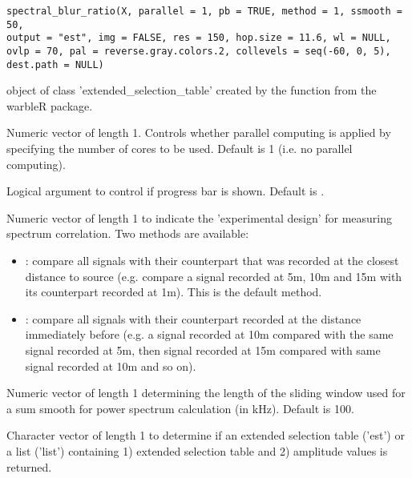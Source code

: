 \documentclass[letterpaper]{book}
\begin{document}
%
\begin{Usage}
\begin{verbatim}
spectral_blur_ratio(X, parallel = 1, pb = TRUE, method = 1, ssmooth = 50, 
output = "est", img = FALSE, res = 150, hop.size = 11.6, wl = NULL, 
ovlp = 70, pal = reverse.gray.colors.2, collevels = seq(-60, 0, 5), dest.path = NULL)
\end{verbatim}
\end{Usage}
%
\begin{Arguments}
\begin{ldescription}
\item[\code{X}] object of class 'extended\_selection\_table' created by the function  from the warbleR package.

\item[\code{parallel}] Numeric vector of length 1. Controls whether parallel computing is applied by specifying the number of cores to be used. Default is 1 (i.e. no parallel computing).

\item[\code{pb}] Logical argument to control if progress bar is shown. Default is .

\item[\code{method}] Numeric vector of length 1 to indicate the 'experimental design' for measuring spectrum correlation. Two methods are available:
\begin{itemize}

\item{} : compare all signals with their counterpart that was recorded at the closest distance to source (e.g. compare a signal recorded at 5m, 10m and 15m with its counterpart recorded at 1m). This is the default method. 
\item{} : compare all signals with their counterpart recorded at the distance immediately before (e.g. a signal recorded at 10m compared with the same signal recorded at 5m, then signal recorded at 15m compared with same signal recorded at 10m and so on).

\end{itemize}


\item[\code{ssmooth}] Numeric vector of length 1 determining the length of the sliding window used for a sum smooth for power spectrum calculation (in kHz). Default is 100.

\item[\code{output}] Character vector of length 1 to determine if an extended selection table ('est') or a list ('list') containing 1) extended selection table and 2) amplitude values is returned.


\end{ldescription}
\end{Arguments}
\end{document}
